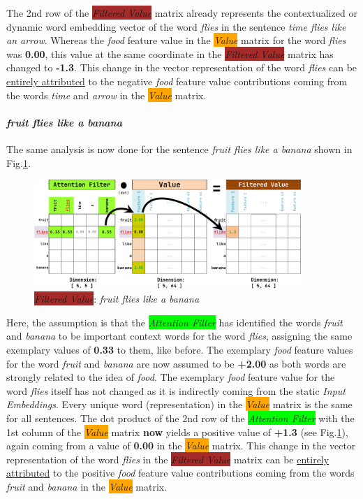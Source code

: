 The 2nd row of the \colorbox{brown}{\emph{Filtered Value}} matrix already represents the contextualized or dynamic word embedding vector of the word \emph{flies} in the sentence \emph{time flies like an arrow}.
Whereas the \emph{food} feature value in the \colorbox{orange}{\emph{Value}} matrix for the word \emph{flies} was \textbf{0.00}, this value at the same coordinate in the \colorbox{brown}{\emph{Filtered Value}} matrix has changed to \textbf{-1.3}.
This change in the vector representation of the word \emph{flies} can be \underline{entirely attributed} to the negative \emph{food} feature value contributions coming from the words \emph{time} and \emph{arrow} in the \colorbox{orange}{\emph{Value}} matrix.

\paragraph{\emph{fruit flies like a banana}}
The same analysis is now done for the sentence \emph{fruit flies like a banana} shown in Fig.\ref{fig:filteredvalues2}.

\begin{figure}[H]
	\centering
	\includegraphics[width=0.9\textwidth]{Assets/filteredvalues2}
	\caption{\colorbox{brown}{\emph{Filtered Value}}: \emph{fruit flies like a banana}}
	\label{fig:filteredvalues2}
\end{figure}

Here, the assumption is that the \colorbox{lime}{\emph{Attention Filter}} has identified the words \emph{fruit} and \emph{banana} to be important context words for the word \emph{flies}, assigning the same exemplary values of \textbf{0.33} to them, like before.
The exemplary \emph{food} feature values for the word \emph{fruit} and \emph{banana} are now assumed to be \textbf{+2.00} as both words are strongly related to the idea of \emph{food}.
The exemplary \emph{food} feature value for the word \emph{flies} itself has not changed as it is indirectly coming from the static \emph{Input Embeddings}.
Every unique word (representation) in the \colorbox{orange}{\emph{Value}} matrix is the same for all sentences.
The dot product of the 2nd row of the \colorbox{lime}{\emph{Attention Filter}} with the 1st column of the \colorbox{orange}{\emph{Value}} matrix \textbf{now} yields a positive value of \textbf{+1.3} (see Fig.\ref{fig:filteredvalues2}), again coming from a value of \textbf{0.00} in the \colorbox{orange}{\emph{Value}} matrix.
This change in the vector representation of the word \emph{flies} in the \colorbox{brown}{\emph{Filtered Value}} matrix can be \underline{entirely attributed} to the positive \emph{food} feature value contributions coming from the words \emph{fruit} and \emph{banana} in the \colorbox{orange}{\emph{Value}} matrix.

